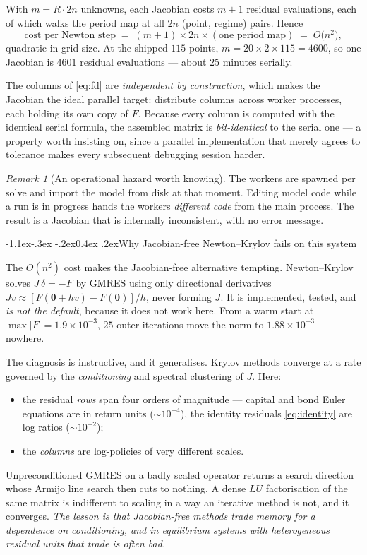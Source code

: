 \documentclass[10pt,a4paper]{article}
\makeatletter
\theoremstyle{definition}
\theoremstyle{plain}
\theoremstyle{remark}
\newtheorem{rem}[defn]{Remark}
\newcommand{\pol}{\bm{\theta}}
\renewcommand\subsection{\@startsection{subsection}{2}{\z@}%
  {-1.1ex\@plus -.3ex \@minus -.2ex}{0.4ex \@plus .2ex}{\normalfont\normalsize\bfseries}}
\makeatother
\begin{document}
With $m = R\cdot2n$ unknowns, each Jacobian costs $m+1$ residual evaluations, each of which
walks the period map at all $2n$ (point, regime) pairs. Hence
\begin{equation}
  \text{cost per Newton step} \;=\; (m+1)\times 2n \times (\text{one period map})
  \;=\; O\!\big(n^2\big),
\end{equation}
quadratic in grid size. At the shipped $115$ points, $m = 20\times2\times115 = 4600$, so one
Jacobian is $4601$ residual evaluations --- about $25$ minutes serially.

The columns of \eqref{eq:fd} are \emph{independent by construction}, which makes the Jacobian
the ideal parallel target: distribute columns across worker processes, each holding its own
copy of $F$. Because every column is computed with the identical serial formula, the assembled
matrix is \emph{bit-identical} to the serial one --- a property worth insisting on, since a
parallel implementation that merely agrees to tolerance makes every subsequent debugging
session harder.

\begin{rem}[An operational hazard worth knowing]
The workers are spawned per solve and import the model from disk at that moment. Editing
model code while a run is in progress hands the workers \emph{different code} from the main
process. The result is a Jacobian that is internally inconsistent, with no error message.
\end{rem}

\subsection{Why Jacobian-free Newton--Krylov fails on this system}

The $O(n^2)$ cost makes the Jacobian-free alternative tempting. Newton--Krylov solves
$J\,\delta = -F$ by GMRES using only directional derivatives $J v \approx [F(\pol+hv) -
F(\pol)]/h$, never forming $J$. It is implemented, tested, and \emph{is not the default},
because it does not work here. From a warm start at $\max|F| = 1.9\times10^{-3}$, $25$ outer
iterations move the norm to $1.88\times10^{-3}$ --- nowhere.

The diagnosis is instructive, and it generalises. Krylov methods converge at a rate governed
by the \emph{conditioning} and spectral clustering of $J$. Here:
\begin{itemize}
\item the residual \emph{rows} span four orders of magnitude --- capital and bond Euler
equations are in return units ($\sim 10^{-4}$), the identity residuals \eqref{eq:identity} are
log ratios ($\sim 10^{-2}$);
\item the \emph{columns} are log-policies of very different scales.
\end{itemize}
Unpreconditioned GMRES on a badly scaled operator returns a search direction whose Armijo
line search then cuts to nothing. A dense $LU$ factorisation of the same matrix is indifferent
to scaling in a way an iterative method is not, and it converges. \emph{The lesson is that
Jacobian-free methods trade memory for a dependence on conditioning, and in equilibrium
systems with heterogeneous residual units that trade is often bad.}
\end{document}
